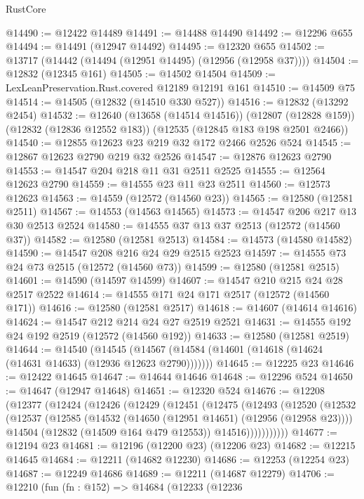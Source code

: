 \begin{lexlean}{RustCore}
\begin{coremodule}
@14490 := @12422 @14489
@14491 := @14488 @14490
@14492 := @12296 @655
@14494 := @14491 (@12947 @14492)
@14495 := @12320 @655
@14502 := @13717 (@14442 (@14494 (@12951 @14495) (@12956 (@12958 @37))))
@14504 := @12832 (@12345 @161)
@14505 := @14502 @14504
@14509 := LexLeanPreservation.Rust.covered @12189 @12191 @161
@14510 := @14509 @75
@14514 := @14505 (@12832 (@14510 @330 @527))
@14516 := @12832 (@13292 @2454)
@14532 := @12640
    (@13658 (@14514 @14516))
    (@12807 (@12828 @159))
    (@12832 (@12836 @12552 @183))
    (@12535 (@12845 @183 @198 @2501 @2466))
@14540 := @12855 @12623 @23 @219 @32 @172 @2466 @2526 @524
@14545 := @12867 @12623 @2790 @219 @32 @2526
@14547 := @12876 @12623 @2790
@14553 := @14547 @204 @218 @11 @31 @2511 @2525
@14555 := @12564 @12623 @2790
@14559 := @14555 @23 @11 @23 @2511
@14560 := @12573 @12623
@14563 := @14559 (@12572 (@14560 @23))
@14565 := @12580 (@12581 @2511)
@14567 := @14553 (@14563 @14565)
@14573 := @14547 @206 @217 @13 @30 @2513 @2524
@14580 := @14555 @37 @13 @37 @2513 (@12572 (@14560 @37))
@14582 := @12580 (@12581 @2513)
@14584 := @14573 (@14580 @14582)
@14590 := @14547 @208 @216 @24 @29 @2515 @2523
@14597 := @14555 @73 @24 @73 @2515 (@12572 (@14560 @73))
@14599 := @12580 (@12581 @2515)
@14601 := @14590 (@14597 @14599)
@14607 := @14547 @210 @215 @24 @28 @2517 @2522
@14614 := @14555 @171 @24 @171 @2517 (@12572 (@14560 @171))
@14616 := @12580 (@12581 @2517)
@14618 := @14607 (@14614 @14616)
@14624 := @14547 @212 @214 @24 @27 @2519 @2521
@14631 := @14555 @192 @24 @192 @2519 (@12572 (@14560 @192))
@14633 := @12580 (@12581 @2519)
@14644 := @14540
    (@14545 (@14567 (@14584 (@14601 (@14618 (@14624 (@14631 @14633) (@12936 @12623 @2790)))))))
@14645 := @12225 @23
@14646 := @12422 @14645
@14647 := @14644 @14646
@14648 := @12296 @524
@14650 := @14647 (@12947 @14648)
@14651 := @12320 @524
@14676 := @12208
    (@12377
      (@12424
        (@12426
          (@12429
            (@12451
              (@12475
                (@12493
                  (@12520
                    (@12532
                      (@12537
                        (@12585
                          (@14532 (@14650 (@12951 @14651) (@12956 (@12958 @23))))
                          @14504
                          (@12832 (@14509 @164 @479 @12553))
                          @14516)))))))))))
@14677 := @12194 @23
@14681 := @12196 (@12200 @23) (@12206 @23)
@14682 := @12215 @14645
@14684 := @12211 (@14682 @12230)
@14686 := @12253 (@12254 @23)
@14687 := @12249 @14686
@14689 := @12211 (@14687 @12279)
@14706 := @12210
    (fun (fn : @152) =>
    @14684
      (@12233
        (@12236

\end{coremodule}
\end{lexlean}
